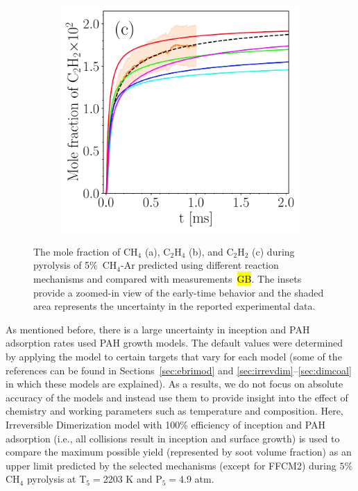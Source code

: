 \begin{figure}[H]
\begin{subfigure}[t]{0.32\textwidth}
	\end{subfigure}
	\begin{subfigure}[t]{0.32\textwidth}
		\includegraphics[width=1\textwidth]{Figures/Results/chemistry/C2H2.pdf}
	\end{subfigure}
	\caption{The mole fraction of $\mathrm{CH_4}$ (a), $\mathrm{C_2H_4}$ (b), and $\mathrm{C_2H_2}$ (c) during pyrolysis of 5\%~$\mathrm{CH_4}$-Ar predicted using different reaction mechanisms and compared with measurements~\hl{GB}. The insets provide a zoomed-in view of the early-time behavior and the shaded area represents the uncertainty in the reported experimental data.}
	\label{fig:CH4_C2H2_C2H4_chem} 
\end{figure}

As mentioned before, there is a large uncertainty in inception and PAH adsorption rates used PAH growth models. The default values were determined by applying the model to certain targets that vary for each model (some of the references can be found in Sections~\ref{sec:ebrimod} and \ref{sec:irrevdim}–\ref{sec:dimcoal} in which these models are explained). As a results, we do not focus on absolute accuracy of the models and instead use them to provide insight into the effect of chemistry and working parameters such as temperature and composition.
Here, Irreversible Dimerization model with 100\% efficiency of inception and PAH adsorption (i.e., all collisions result in inception and surface growth) is used to compare the maximum possible yield (represented by soot volume fraction) as an upper limit predicted by the selected mechanisms (except for FFCM2) during $5\%$ $\mathrm{CH_4}$ pyrolysis at $\mathrm{T_5}=$2203 K and $\mathrm{P_5}=$4.9 atm. 


